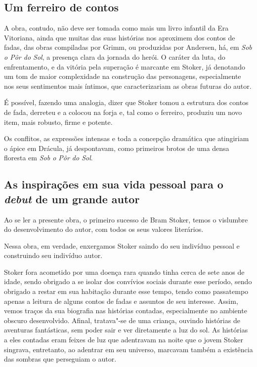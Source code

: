 \documentclass[12pt]{extarticle}
\begin{document}
\subsection{Um ferreiro de contos}

A obra, contudo, não deve ser tomada como mais um livro infantil da Era
Vitoriana, ainda que muitas das suas histórias nos aproximem dos contos
de fadas, das obras compiladas por Grimm, ou produzidas por Andersen,
há, em \emph{Sob o Pôr do Sol}, a presença clara da jornada do herói. O
caráter da luta, do enfrentamento, e da vitória pela superação é
marcante em Stoker, já denotando um tom de maior complexidade na
construção das personagens, especialmente nos seus sentimentos mais
íntimos, que caracterizariam as obras futuras do autor.

É possível, fazendo uma analogia, dizer que Stoker tomou a estrutura dos
contos de fada, derreteu e a colocou na forja e, tal como o ferreiro,
produziu um novo item, mais robusto, firme e potente.

Os conflitos, as expressões intensas e toda a concepção dramática que
atingiriam o ápice em Drácula, já despontavam, como primeiros brotos de
uma densa floresta em \emph{Sob o Pôr do Sol}.

\subsection{As inspirações em sua vida pessoal para o \textit{debut} de um grande autor}

Ao se ler a presente obra, o primeiro sucesso de Bram Stoker, temos o
vislumbre do desenvolvimento do autor, com todos os seus valores
literários.

Nessa obra, em verdade, enxergamos Stoker saindo do seu indivíduo
pessoal e construindo seu indivíduo autor.

Stoker fora acometido por uma doença rara quando tinha cerca de sete
anos de idade, sendo obrigado a se isolar dos convívios sociais durante
esse período, sendo obrigado a restar em sua habitação durante esse
tempo, tendo como passatempo apenas a leitura de alguns contos de fadas
e assuntos de seu interesse. Assim, vemos traços da sua biografia nas
histórias contadas, especialmente no ambiente obscuro desenvolvido.
Afinal, tratava"-se de uma criança, ouvindo histórias de aventuras
fantásticas, sem poder sair e ver diretamente a luz do sol. As histórias
a eles contadas eram feixes de luz que adentravam na noite que o jovem
Stoker singrava, entretanto, ao adentrar em seu universo, marcavam
também a existência das sombras que perseguiam o autor.
\end{document}
